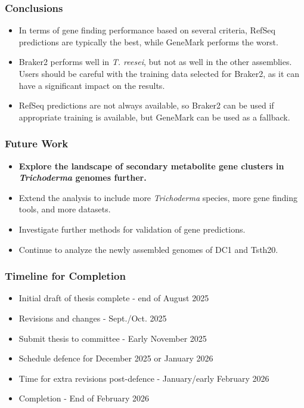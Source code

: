 \documentclass[t]{beamer}
\begin{document}
\begin{frame}
	\frametitle{Conclusions}
	\begin{itemize}
		\item In terms of gene finding performance based on several criteria, RefSeq predictions are typically the best, while GeneMark performs the worst.
		\item Braker2 performs well in \textit{T. reesei}, but not as well in the other assemblies. Users should be careful with the training data selected for Braker2, as it can have a significant impact on the results.
		\item RefSeq predictions are not always available, so Braker2 can be used if appropriate training is available, but GeneMark can be used as a fallback.
	\end{itemize}
\end{frame}

\begin{frame}
	\frametitle{Future Work}
	\begin{itemize}
		\item \textbf{Explore the landscape of secondary metabolite gene clusters in \textit{Trichoderma} genomes further.}
		\item Extend the analysis to include more \textit{Trichoderma} species, more gene finding tools, and more datasets.
		\item Investigate further methods for validation of gene predictions.
		\item Continue to analyze the newly assembled genomes of DC1 and Tsth20.
	\end{itemize}
\end{frame}

\begin{frame}
	\frametitle{Timeline for Completion}
	\begin{itemize}
    	\item Initial draft of thesis complete - end of August 2025
    	\item Revisions and changes - Sept./Oct. 2025
    	\item Submit thesis to committee - Early November 2025
    	\item Schedule defence for December 2025 or January 2026
    	\item Time for extra revisions post-defence - January/early February 2026
    	\item Completion - End of February 2026
	\end{itemize}
\end{frame}
\end{document}
